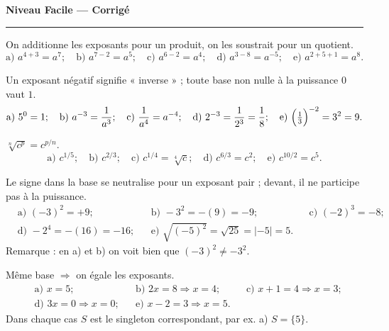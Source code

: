 \documentclass[11pt,a4paper]{article}
\begin{document}
\begin{center}
{\LARGE\bfseries\color{primarydark} Niveau Facile — Corrigé}\\[2pt]
{\color{primary}\rule{0.45\textwidth}{1.2pt}}
\end{center}
\vspace{1mm}

\begin{corrige}
On additionne les exposants pour un produit, on les soustrait pour un quotient.
\[ \text{a) } a^{4+3}=a^{7};\quad \text{b) } a^{7-2}=a^{5};\quad \text{c) } a^{6-2}=a^{4};\quad
   \text{d) } a^{3-8}=a^{-5};\quad \text{e) } a^{2+5+1}=a^{8}. \]
\end{corrige}

\begin{corrige}
Un exposant négatif signifie « inverse » ; toute base non nulle à la puissance $0$ vaut $1$.
\[ \text{a) } 5^{0}=1;\quad \text{b) } a^{-3}=\frac{1}{a^{3}};\quad \text{c) } \frac{1}{a^{4}}=a^{-4};\quad
   \text{d) } 2^{-3}=\frac{1}{2^{3}}=\frac18;\quad \text{e) } \Bigl(\tfrac13\Bigr)^{-2}=3^{2}=9. \]
\end{corrige}

\begin{corrige}
$\sqrt[n]{c^{p}}=c^{p/n}$.
\[ \text{a) } c^{1/5};\quad \text{b) } c^{2/3};\quad \text{c) } c^{1/4}=\sqrt[4]{c};\quad
   \text{d) } c^{6/3}=c^{2};\quad \text{e) } c^{10/2}=c^{5}. \]
\end{corrige}

\begin{corrige}
Le signe dans la base se neutralise pour un exposant pair ; devant, il ne participe pas à la puissance.
\begin{align*}
&\text{a) } (-3)^{2}=+9; &&\text{b) } -3^{2}=-(9)=-9; &&\text{c) } (-2)^{3}=-8;\\
&\text{d) } -2^{4}=-(16)=-16; &&\text{e) } \sqrt{(-5)^{2}}=\sqrt{25}=|-5|=5.
\end{align*}
Remarque : en a) et b) on voit bien que $(-3)^2\neq -3^2$.
\end{corrige}

\begin{corrige}
Même base $\Rightarrow$ on égale les exposants.
\begin{align*}
&\text{a) } x=5; &&\text{b) } 2x=8\Rightarrow x=4; &&\text{c) } x+1=4\Rightarrow x=3;\\
&\text{d) } 3x=0\Rightarrow x=0; &&\text{e) } x-2=3\Rightarrow x=5.
\end{align*}
Dans chaque cas $S$ est le singleton correspondant, par ex. a) $S=\{5\}$.
\end{corrige}
\end{document}
